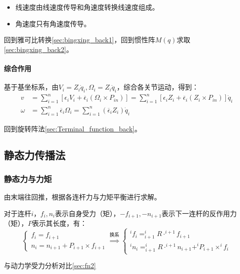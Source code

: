\documentclass[
12pt, %
a4paper, 
oneside, %
headinclude,footinclude, %
]{scrartcl}
\begin{document}
\begin{itemize}
\item 线速度由线速度传导和角速度转换线速度组成。
\item 角速度只有角速度传导。
\end{itemize} 

回到雅可比转换\ref{sec:bingxing_back1}，回到惯性阵$ M(q) $求取\ref{sec:bingxing_back2}。
\paragraph{综合作用}\label{sec:Terminal_function}
基于基坐标系，由$ V_i = Z_i \dot{q}_i, \Omega_i = Z_i \dot{q}_i $，综合各关节运动，得到：
\begin{align*}
v &= \sum_{i = 1}^n [\epsilon_i V_i + \overline{\epsilon}_i (\Omega_i \times P_{in})] = \sum_{i = 1}^n [\epsilon_i Z_i + \overline{\epsilon}_i (Z_i \times P_{in})] \dot{q}_i \\
\omega &= \sum_{i = 1}^n \overline{\epsilon}_i \Omega_i = \sum_{i = 1}^n (\overline{\epsilon}_i Z_i) \dot{q}_i
\end{align*}

回到旋转阵法\ref{sec:Terminal_function_back}。
\subsection[静态力传播法]{静态力传播法}
\subsubsection[静态力与力矩]{静态力与力矩}\label{sec:fn1}
由末端往回推，根据各连杆力与力矩平衡进行求解。

对于连杆$ i $，$ f_i, n_i $表示自身受力（矩），$ -f_{i + 1}, -n_{i + 1} $表示下一连杆的反作用力（矩），$ P $表示其长度，有：
$$
\begin{cases}
f_i = f_{i + 1} \\
n_i = n_{i + 1} + P_{i + 1} \times f_{i + 1}
\end{cases}
\overset{\text{换系}}{\Longrightarrow}
\begin{cases}
^i f_i = ^i_{i + 1}R \cdot ^{i + 1} f_{i + 1} \\
^i n_i = ^i_{i + 1}R \cdot ^{i + 1} n_{i + 1} + ^i P_{i + 1} \times ^i f_i
\end{cases}
$$

与动力学受力分析对比\ref{sec:fn2}
\end{document}

